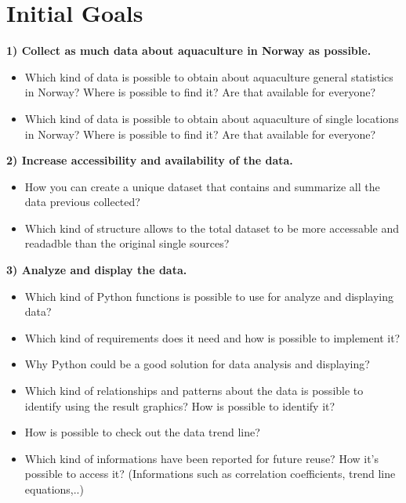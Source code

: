 \newpage
\section{Initial Goals}

\textbf{1) Collect as much data about aquaculture in Norway as possible.}
\vspace{-5mm}
\begin{itemize}
 \setlength{\itemsep}{-5pt}
  \item Which kind of data is possible to obtain about aquaculture general statistics in Norway? Where is possible to find it? Are that available for everyone?
  \item Which kind of data is possible to obtain about aquaculture of single locations in Norway? Where is possible to find it? Are that available for everyone?
\end{itemize}

 
\textbf{2) Increase accessibility and availability of the data.}
\vspace{-5mm}
\begin{itemize}
 \setlength{\itemsep}{-5pt}
  \item How you can create a unique dataset that contains and summarize all the data previous collected?
  \item Which kind of structure allows to the total dataset to be more accessable and readadble than the original single sources?
\end{itemize}
 
\textbf{3) Analyze and display the data.}
\vspace{-5mm}
\begin{itemize}
 \setlength{\itemsep}{-5pt}
  \item Which kind of Python functions is possible to use for analyze and displaying data? 
  \item Which kind of requirements does it need and how is possible to implement it?
  \item Why Python could be a good solution for data analysis and displaying? 
  \item Which kind of relationships and patterns about the data is possible to identify using the result graphics? How is possible to identify it?
  \item How is possible to check out the data trend line? 
  \item Which kind of informations have been reported for future reuse? How it's possible to access it? (Informations such as correlation coefficients, trend line equations,..)
 \end{itemize}


